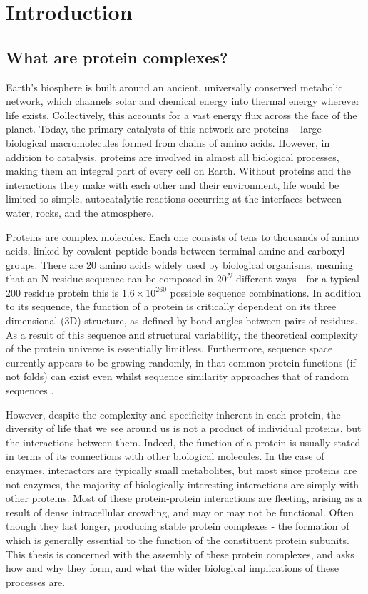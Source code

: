 \documentclass[a4paper,11pt,twoside,openright]{scrbook}
\begin{document}
\chapter{Introduction} \label{chapter:intro}

\section{What are protein complexes?}
Earth’s biosphere is built around an ancient, universally conserved metabolic network, which channels solar and chemical energy into thermal energy wherever life exists. Collectively, this accounts for a vast energy flux across the face of the planet. Today, the primary catalysts of this network are proteins – large biological macromolecules formed from chains of amino acids. However, in addition to catalysis, proteins are involved in almost all biological processes, making them an integral part of every cell on Earth. Without proteins and the interactions they make with each other and their environment, life would be limited to simple, autocatalytic reactions occurring at the interfaces between water, rocks, and the atmosphere.

Proteins are complex molecules. Each one consists of tens to thousands of amino acids, linked by covalent peptide bonds between terminal amine and carboxyl groups. There are 20 amino acids widely used by biological organisms, meaning that an N residue sequence can be composed in \(20^{N}\) different ways - for a typical 200 residue protein this is \(1.6 \times 10^{260}\) possible sequence combinations. In addition to its sequence, the function of a protein is critically dependent on its three dimensional (3D) structure, as defined by bond angles between pairs of residues. As a result of this sequence and structural variability, the theoretical complexity of the protein universe is essentially limitless. Furthermore, sequence space currently appears to be growing randomly, in that common protein functions (if not folds) can exist even whilst sequence similarity approaches that of random sequences \cite{Larson2002,Povolotskaya2010}.

However, despite the complexity and specificity inherent in each protein, the diversity of life that we see around us is not a product of individual proteins, but the interactions between them. Indeed, the function of a protein is usually stated in terms of its connections with other biological molecules. In the case of enzymes, interactors are typically small metabolites, but most since proteins are not enzymes, the majority of biologically interesting interactions are simply with other proteins. Most of these protein-protein interactions are fleeting, arising as a result of dense intracellular crowding, and may or may not be functional. Often though they last longer, producing stable protein complexes - the formation of which is generally essential to the function of the constituent protein subunits. This thesis is concerned with the assembly of these protein complexes, and asks how and why they form, and what the wider biological implications of these processes are.
\end{document}
